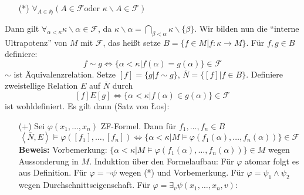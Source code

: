 \documentclass[a4paper,fontsize=11pt]{scrartcl}
\begin{document}
\begin{itemize}
\begin{itemize}
        \item[(*)] $\forall_{A\in\mathfrak{H}}(A\in\mathcal{F}\mbox{
          oder }\kappa\backslash A\in\mathcal{F})$ \newline [beachte:
          gilt ``entweder oder'', da sonst
          $\emptyset=A\cap(\kappa\backslash A)\in\mathcal{F}$]
      \end{itemize}
      Dann gilt $\forall_{\alpha<\kappa}
      \kappa\backslash\alpha\in\mathcal{F}$, da
      $\kappa\backslash\alpha=
      \bigcap\limits_{\beta<\alpha}\kappa\backslash\{\beta\}$. Wir
      bilden nun die ``interne Ultrapotenz'' von $M$ mit
      $\mathcal{F}$, das heißt setze $B=\{f\in M|f:\kappa\rightarrow
      M\}$. Für $f,g\in B$ definiere:
      $$ f \sim g \Leftrightarrow
      \{\alpha<\kappa|f(\alpha)=g(\alpha)\}\in\mathcal{F} $$ $\sim$
      ist Äquivalenzrelation. Setze $[f]=\{g|f\sim g\}$,
      $\overline{N}=\{[f]|f\in B\}$. Definiere zweistellige Relation
      $E$ auf $\overline{N}$ durch
      $$ [f]E[g]\Leftrightarrow\{\alpha<\kappa|f(\alpha)\in
      g(\alpha)\}\in\mathcal{F} $$ ist wohldefiniert.  Es gilt dann
      (Satz von Łos):
      \begin{itemize}
        \item[(+)] Sei $\varphi(x_1,\ldots,x_n)$ ZF-Formel. Dann für
          $f_1,\ldots,f_n\in B$
          $$ \left<\overline{N},E\right>\models
          \varphi([f_1],\ldots,[f_n])\Leftrightarrow
          \{\alpha<\kappa|M\models
          \varphi(f_1(\alpha),\ldots,f_n(\alpha))\}\in\mathcal{F} $$
                 {\bf Beweis:} Vorbemerkung: $\{\alpha<\kappa|M\models
                 \varphi(f_1(\alpha),\ldots,f_n(\alpha))\}\in M$ wegen
                 Aussonderung in $M$. \newline Induktion über den
                 Formelaufbau: Für $\varphi$ atomar folgt es aus
                 Definition. Für $\varphi=\lnot\psi$ wegen (*) und
                 Vorbemerkung. Für $\varphi=\psi_1\wedge\psi_2$ wegen
                 Durchschnittseigenschaft. Für
                 $\varphi=\exists_v\psi(x_1,\ldots,x_n,v)$:
\end{itemize}
\end{itemize}
\end{document}
